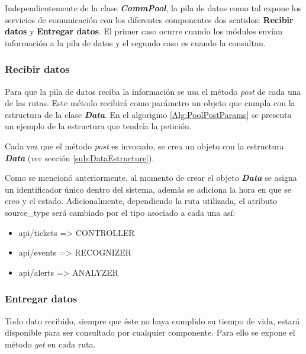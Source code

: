         Independientemente de la clase \textbf{\textit{CommPool}}, la pila de datos como tal expone los servicios de comunicación con los diferentes componentes dos sentidos:  \textbf{Recibir datos} y \textbf{Entregar datos}. El primer caso ocurre cuando los módulos envían información a la pila de datos y el segundo caso es cuando la consultan.

        \subsubsection{Recibir datos}
        \label{sub2:PoolPost}
            Para que la pila de datos reciba la información se usa el método \textit{post} de cada una de las rutas. Este método recibirá como parámetro un objeto que cumpla con la estructura de la clase \textbf{\textit{Data}}. En el algorigmo \ref{Alg:PoolPostParams} se presenta un ejemplo de la estructura que tendría la petición.
            
            
            
            Cada vez que el método \textit{post} es invocado, se crea un objeto con la estructura \textbf{\textit{Data}} (ver sección \ref{sub:DataEstructure}). 
            
            Como se mencionó anteriormente, al momento de crear el objeto \textbf{\textit{Data}} se asigna un identificador único dentro del sistema, además se adiciona la hora en que se creo y el estado. Adicionalmente, dependiendo la ruta utilizada, el atributo source\_type será cambiado por el tipo asociado a cada una así: 
            
            \begin{itemize}
                \item api/tickets => CONTROLLER
                \item api/events  => RECOGNIZER
                \item api/alerts  => ANALYZER
            \end{itemize}
        
        \subsubsection{Entregar datos}
        \label{sub2:PoolGet}
            Todo dato recibido, siempre que éste no haya cumplido su tiempo de vida, estará disponible para ser consultado por cualquier componente. Para ello se expone el método \textit{get} en cada ruta. 
            
